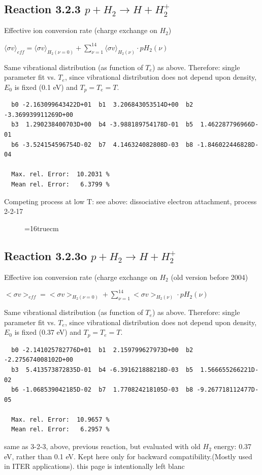 \documentclass[12pt,dvips]{article}
\begin{document}
\subsection{
Reaction 3.2.3   $p + H_2 \rightarrow H + H_2^+  $
}

  Effective ion conversion rate (charge exchange on $H_2$)

  $ \langle\sigma v \rangle_{eff} = \langle\sigma v \rangle_{H_2(\nu=0)} + \sum_{\nu=1}^{14}
\langle\sigma v \rangle_{H_2(\nu)} \cdot pH_2(\nu) $

  Same vibrational distribution (as function of $T_e$) as above.
  Therefore:
  single parameter fit vs. $T_e$,
  since vibrational distribution does not depend upon density, $E_0$ is fixed
  (0.1 eV) and $T_p = T_e = T$.

\begin{small}\begin{verbatim}
  b0 -2.163099643422D+01  b1  3.206843053514D+00  b2 -3.369939911269D+00
  b3  1.290238400703D+00  b4 -3.988189754178D-01  b5  1.462287796966D-01
  b6 -3.524154596754D-02  b7  4.146324082808D-03  b8 -1.846022446828D-04

  Max. rel. Error:  10.2031 %
  Mean rel. Error:   6.3799 %

\end{verbatim}\end{small}
Competing process at low T: see above: dissociative electron attachment, process 2-2-17 
\begin{figure} \label{3.2.3}
\epsfxsize=16truecm
\end{figure}
\newpage
\subsection{
Reaction 3.2.3o   $p + H_2 \rightarrow H + H_2^+  $}

  Effective ion conversion rate (charge exchange on $H_2$ (old version before 2004)

  $ <\sigma v>_{eff} = <\sigma v>_{H_2(\nu=0)} + \sum_{\nu=1}^{14}
<\sigma v>_{H_2(\nu)} \cdot pH_2(\nu) $

  Same vibrational distribution (as function of $T_e$) as above.
  Therefore:
  single parameter fit vs. $T_e$,
  since vibrational distribution does not depend upon density, $E_0$ is fixed
  (0.37 eV) and $T_p = T_e = T$.

\begin{small}\begin{verbatim}
  b0 -2.141025782776D+01  b1  2.159799627973D+00  b2 -2.275674008102D+00
  b3  5.413573872835D-01  b4 -6.391621888218D-03  b5  1.566655266221D-02
  b6 -1.068539042185D-02  b7  1.770824218105D-03  b8 -9.267718112477D-05

  Max. rel. Error:  10.9657 %
  Mean rel. Error:   6.2957 %
\end{verbatim}\end{small}
same as 3-2-3, above, previous reaction, but evaluated with old $H_2$ energy: 0.37 eV, rather than 0.1 eV.
Kept here only for backward compatibility.(Mostly used in ITER applications).
\newpage
this page is intentionally left blanc
\newpage
\end{document}
